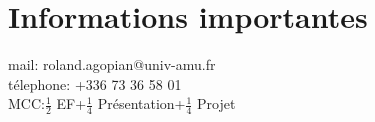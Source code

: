\section{Informations importantes}
mail: roland.agopian@univ-amu.fr\\
t\'elephone: +336 73 36 58 01\\
MCC:$\frac{1}{2}$ EF+$\frac{1}{4}$ Pr\'esentation+$\frac{1}{4}$ Projet
